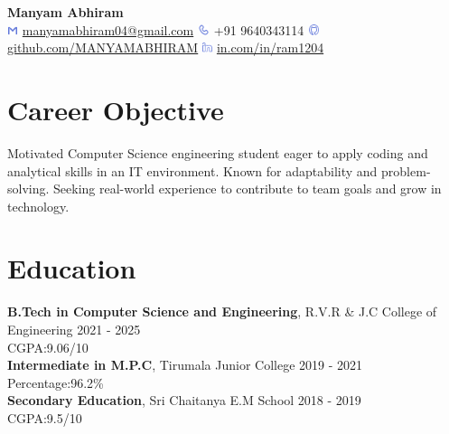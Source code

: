 \documentclass{article}
\begin{document}
\pagestyle{empty}
\hspace{-6.2mm}
{\color{myblue}\fontsize{30}{30}\selectfont \textbf{Manyam Abhiram}} \\
\vspace{2mm}
\includegraphics[width=3.2mm, height = 2.5mm]{mailsvg.png} 
{\color{myblue}\fontsize{9}{9}\selectfont \href{mailto:manyamabhiram04@gmail.com}{manyamabhiram04@gmail.com}}
\hspace{2.5mm}
\includegraphics[width=3.5mm, height = 3mm]{callingsvg.png}
{\color{myblue}\fontsize{9}{9}\selectfont +91 9640343114}
\hspace{2mm}
\includegraphics[width=3.5mm, height = 3mm]{githubsvg.png} 
{\color{myblue}\fontsize{9}{9}\selectfont \href{https://www.github.com/MANYAMABHIRAM}{github.com/MANYAMABHIRAM}}
\hspace{2.5mm}
\includegraphics[width=3mm, height = 3mm]{insvg.png} 
{\color{myblue}\fontsize{9}{9}\selectfont \href{https://www.linkedin.com/in/ram1204}{in.com/in/ram1204}}
\vspace{-11mm}
\section*{Career Objective}
\vspace{-3mm}
\begin{justify}
Motivated Computer Science engineering student eager to apply coding and analytical skills in an IT environment. Known for adaptability and problem-solving. Seeking real-world experience to contribute to team goals and grow in technology.\end{justify}
\vspace{-8mm}
\section*{Education}
\vspace{-3mm}
{\fontsize{11}{11}\selectfont \textbf{B.Tech in Computer Science and Engineering}}, R.V.R \& J.C College of Engineering
\hfill2021 - 2025\\[0.5mm]
\noindent
CGPA:9.06/10\\[0.5mm]
{\fontsize{11}{11}\selectfont \textbf{Intermediate in M.P.C}}, Tirumala Junior College
\hfill2019 - 2021\\
\hspace{-1mm}
Percentage:96.2\%\\[0.5mm]
{\fontsize{11}{11}\selectfont \textbf{Secondary Education}}, Sri Chaitanya E.M School
\hfill2018 - 2019\\[0.5mm]
\hspace{-1mm}
CGPA:9.5/10
\vspace{-5mm}
\end{document}
